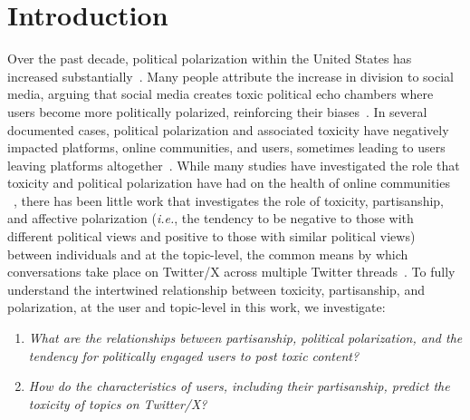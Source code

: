 \section{Introduction}
\vspace{1pt}
\noindent{}
\vspace{1pt}

\noindent
Over the past decade, political polarization within the United States has increased substantially~\cite{hong2016political,chen2022misleading,gaughan2016illiberal,gervais2015incivility,borah2013interactions,goovaerts2020uncivil}. Many people attribute the increase in division to social media, arguing that social media creates toxic political echo chambers where users become more politically polarized, reinforcing their biases~\cite{sunstein2018social,wojcieszak2022most}. In several documented cases, political polarization and associated toxicity have negatively impacted platforms, online communities, and users, sometimes leading to users leaving platforms altogether~\cite{pew-2017}. While many studies have investigated the role that toxicity and political polarization have had on the health of online communities ~\cite{tucker2017liberation,tucker2018social,torres2022manufacture,persily20172016,gron2020party,saveski2021structure}, there has been little work that investigates the role of toxicity, partisanship, and affective polarization (\textit{i.e.}, the tendency to be negative to those with different political views and positive to those with similar political views) between individuals and at the topic-level, the common means by which conversations take place on Twitter/X across multiple Twitter threads~\cite{wieringa2018political, quercia2012social,arslan2022understanding}. To fully understand the intertwined relationship between toxicity, partisanship, and polarization, at the user and topic-level in this work, we investigate:

\begin{enumerate}
    \item \textit{What are the relationships between partisanship, political polarization, and the tendency for politically engaged users to post toxic content?}
    \item \textit{How do the characteristics of users, including their partisanship, predict the toxicity of topics on Twitter/X?} 
\end{enumerate}

